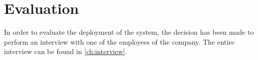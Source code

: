 \section{Evaluation} \label{sec:sb-evaluation}
In order to evaluate the deployment of the system, the decision has been made to perform an interview with one of the employees of the company. The entire interview can be found in \autoref{ch:interview}.